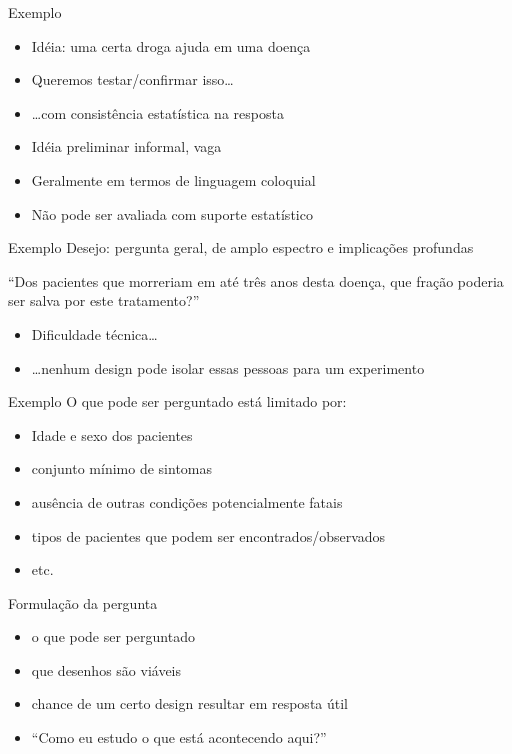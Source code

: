 \documentclass{beamer}
\begin{document}
\begin{frame}{Exemplo}
  \begin{example}
    \begin{itemize}
    \item Idéia: uma certa droga ajuda em uma doença
    \item Queremos testar/confirmar isso\ldots
    \item \ldots com consistência estatística na resposta
    \end{itemize}
  \end{example}
  \begin{itemize}
  \item Idéia preliminar informal, vaga
  \item Geralmente em termos de linguagem coloquial
  \item Não pode ser avaliada com suporte estatístico
  \end{itemize}
\end{frame}

\begin{frame}{Exemplo}
Desejo: pergunta geral, de amplo espectro e implicações profundas
\begin{example}
  ``Dos pacientes que morreriam em até três anos desta doença, que
  fração poderia ser salva por este tratamento?''
\end{example}
\begin{itemize}
\item Dificuldade técnica\ldots
\item \ldots nenhum design pode isolar essas pessoas para um experimento
\end{itemize}
\end{frame}

\begin{frame}{Exemplo}
  O que \alert{pode} ser perguntado está limitado por:
  \begin{itemize}
  \item Idade e sexo dos pacientes
  \item conjunto mínimo de sintomas
  \item ausência de outras condições potencialmente fatais
  \item tipos de pacientes que podem ser encontrados/observados
  \item etc.
  \end{itemize}
\end{frame}

\begin{frame}{Formulação da pergunta}
  \begin{itemize}
  \item o que pode ser perguntado
  \item que desenhos são viáveis
  \item chance de um certo design resultar em resposta útil
  \item ``Como eu estudo o que está acontecendo aqui?''
  \end{itemize}
\end{frame}
\end{document}
